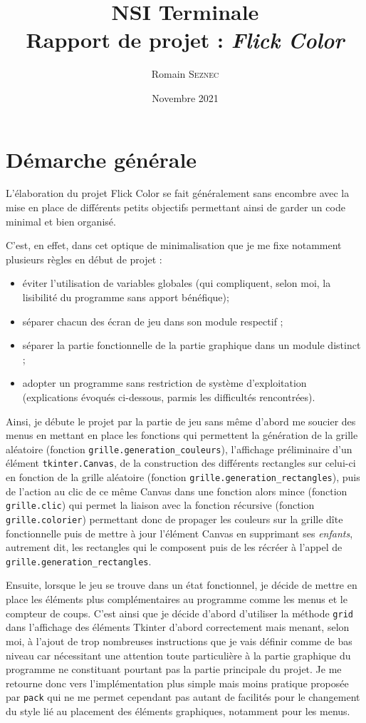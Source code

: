 \documentclass[a4]{article}
\title{NSI Terminale\\Rapport de projet : \textit{Flick Color}}
\author{Romain \textsc{Seznec}}
\date{Novembre 2021}
\begin{document}
\maketitle

\section{Démarche générale}

L'élaboration du projet Flick Color se fait généralement sans encombre avec la mise en place de différents petits objectifs permettant ainsi de garder un code minimal et bien organisé.

C'est, en effet, dans cet optique de minimalisation que je me fixe notamment plusieurs règles en début de projet :

\begin{itemize}
	\item éviter l'utilisation de variables globales (qui compliquent, selon moi, la lisibilité du programme sans apport bénéfique);
	\item séparer chacun des écran de jeu dans son module respectif ;
	\item séparer la partie fonctionnelle de la partie graphique dans un module distinct ;
	\item adopter un programme sans restriction de système d'exploitation (explications évoqués ci-dessous, parmis les difficultés rencontrées).
\end{itemize}

Ainsi, je débute le projet par la partie de jeu sans même d'abord me soucier des menus en mettant en place les fonctions qui permettent la génération de la grille aléatoire (fonction \texttt{grille.generation\_couleurs}), l'affichage préliminaire d'un élément \texttt{tkinter.Canvas}, de la construction des différents rectangles sur celui-ci en fonction de la grille aléatoire (fonction \texttt{grille.generation\_rectangles}), puis de l'action au clic de ce même Canvas dans une fonction alors mince (fonction \texttt{grille.clic}) qui permet la liaison avec la fonction récursive (fonction \texttt{grille.colorier}) permettant donc de propager les couleurs sur la grille dîte fonctionnelle puis de mettre à jour l'élément Canvas en supprimant ses \textit{enfants}, autrement dit, les rectangles qui le composent puis de les récréer à l'appel de \texttt{grille.generation\_rectangles}.

Ensuite, lorsque le jeu se trouve dans un état fonctionnel, je décide de mettre en place les éléments plus complémentaires au programme comme les menus et le compteur de coups. C'est ainsi que je décide d'abord d'utiliser la méthode \texttt{grid} dans l'affichage des éléments Tkinter d'abord correctement mais menant, selon moi, à l'ajout de trop nombreuses instructions que je vais définir comme de bas niveau car nécessitant une attention toute particulière à la partie graphique du programme ne constituant pourtant pas la partie principale du projet. Je me retourne donc vers l'implémentation plus simple mais moins pratique proposée par \texttt{pack} qui ne me permet cependant pas autant de facilités pour le changement du style lié au placement des éléments graphiques, notamment pour les menus.
\end{document}
